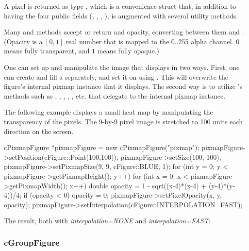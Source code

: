 A pixel is returned as type , which is a convenience
struct that, in addition to having the four public  fields
(, , , ), is augmented with several
utility methods.

Many  and  methods accept or return
 and opacity, converting between them and
. (Opacity is a $[0,1]$ real number that is mapped to the
0..255 alpha channel. $0$ means fully transparent, and $1$ means fully
opaque.)

One can set up and manipulate the image that  displays
in two ways. First, one can create and fill a 
separately, and set it on  using .
This will overwrite the figure's internal pixmap instance that it displays.
The second way is to utilize 's methods such as
, , ,
, , etc. that delegate to
the internal pixmap instance.

The following example displays a small heat map by manipulating the
transparency of the pixels. The 9-by-9 pixel image is stretched to
100 units each direction on the screen.

\begin{cpp}
cPixmapFigure *pixmapFigure = new cPixmapFigure("pixmap");
pixmapFigure->setPosition(cFigure::Point(100,100));
pixmapFigure->setSize(100, 100);
pixmapFigure->setPixmapSize(9, 9, cFigure::BLUE, 1);
for (int y = 0; y < pixmapFigure->getPixmapHeight(); y++) {
    for (int x = 0; x < pixmapFigure->getPixmapWidth(); x++) {
        double opacity = 1 - sqrt((x-4)*(x-4) + (y-4)*(y-4))/4;
        if (opacity < 0) opacity = 0;
        pixmapFigure->setPixelOpacity(x, y, opacity);
    }
}
pixmapFigure->setInterpolation(cFigure::INTERPOLATION_FAST);
\end{cpp}


The result, both with \textit{interpolation=NONE} and \textit{interpolation=FAST}:

\begin{center}
\end{center}


\subsubsection{cGroupFigure}
\label{sec:graphics:groupfigure}

